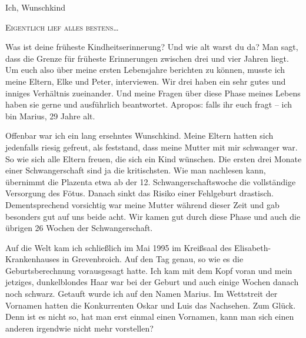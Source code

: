 \documentclass[fontsize=14pt,a4paper,headinclude,DIV=calc,automark]{scrbook}
\begin{document}

\mainmatter

\clearpairofpagestyles %
\rehead{\leftmark}     %
\lehead{\thepage}      %
\rohead{\thepage}      %
\lohead{\leftmark}     %

\pagestyle{scrheadings}

\thispagestyle{scrheadings} %
\leavevmode
{\noindent\fontsize{18}{24}\selectfont\textcolor{myblue}{Ich, Wunschkind}\par}
{\noindent\fontsize{14}{20}\selectfont\scshape\textcolor{myblue}{Eigentlich lief alles bestens}\ldots\par}
\vspace*{0.5\baselineskip}
\normalsize

Was ist deine früheste Kindheitserinnerung? Und wie alt warst du da? Man sagt, dass die Grenze für früheste Erinnerungen zwischen drei und vier Jahren liegt. Um euch also über meine ersten Lebensjahre berichten zu können, musste ich meine Eltern, Elke und Peter, interviewen. Wir drei haben ein sehr gutes und inniges Verhältnis zueinander. Und meine Fragen über diese Phase meines Lebens haben sie gerne und ausführlich beantwortet. Apropos: falls ihr euch fragt – ich bin Marius, 29 Jahre alt.

Offenbar war ich ein lang ersehntes Wunschkind. Meine Eltern hatten sich jedenfalls riesig gefreut, als feststand, dass meine Mutter mit mir schwanger war. So wie sich alle Eltern freuen, die sich ein Kind wünschen. Die ersten drei Monate einer Schwangerschaft sind ja die kritischsten. Wie man nachlesen kann, übernimmt die Plazenta etwa ab der 12. Schwangerschaftswoche die vollständige Versorgung des Fötus. Danach sinkt das Risiko einer Fehlgeburt drastisch. Dementsprechend vorsichtig war meine Mutter während dieser Zeit und gab besonders gut auf uns beide acht. Wir kamen gut durch diese Phase und auch die übrigen 26 Wochen der Schwangerschaft.

Auf die Welt kam ich schließlich im Mai 1995 im Kreißsaal des Elisabeth-Kran\-ken\-hau\-ses in Grevenbroich. Auf den Tag genau, so wie es die Geburtsberechnung vorausgesagt hatte. Ich kam mit dem Kopf voran und mein jetziges, dunkelblondes Haar war bei der Geburt und auch einige Wochen danach noch schwarz. Getauft wurde ich auf den Namen Marius. Im Wettstreit der Vornamen hatten die Konkurrenten Oskar und Luis das Nachsehen. Zum Glück. Denn ist es nicht so, hat man erst einmal einen Vornamen, kann man sich einen anderen irgendwie nicht mehr vorstellen?
\end{document}
